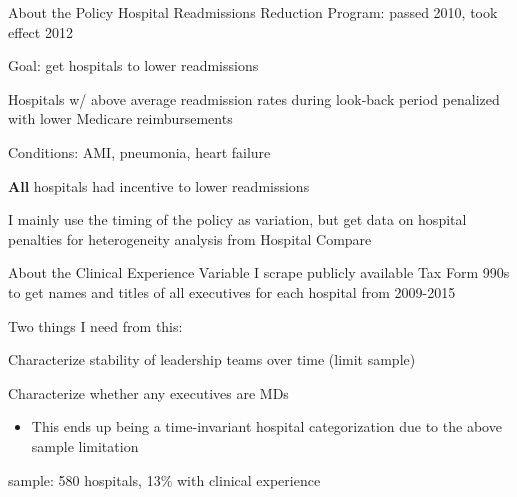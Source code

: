 \documentclass[notes,11pt, aspectratio=169]{beamer}
\newenvironment{wideitemize}{\itemize\addtolength{\itemsep}{10pt}}{\enditemize}
\begin{document}
\begin{frame}{About the Policy}
    Hospital Readmissions Reduction Program: passed 2010, took effect 2012

    \vspace{5mm}

    \begin{wideitemize}
        \item Goal: get hospitals to lower readmissions
        \item Hospitals w/ above average readmission rates during look-back period penalized with lower Medicare reimbursements
        \item Conditions: AMI, pneumonia, heart failure
        \item \textbf{All} hospitals had incentive to lower readmissions
    \end{wideitemize}

    \vspace{5mm}\pause

    I mainly use the timing of the policy as variation, but get data on hospital penalties for heterogeneity analysis from Hospital Compare
\end{frame}

\begin{frame}{About the Clinical Experience Variable}\label{clinexp}
    I scrape publicly available Tax Form 990s to get names and titles of all executives for each hospital from 2009-2015 \hyperlink{execnames}{}

    \vspace{10mm}

    Two things I need from this:
    \begin{wideitemize}
        \item Characterize stability of leadership teams over time (limit sample)
        \item Characterize whether any executives are MDs 
        \begin{itemize}
            \item This ends up being a time-invariant hospital categorization due to the above sample limitation
        \end{itemize}
    \end{wideitemize}

    \vspace{5mm}

    sample: 580 hospitals, 13\% with clinical experience
\end{frame}
\end{document}
